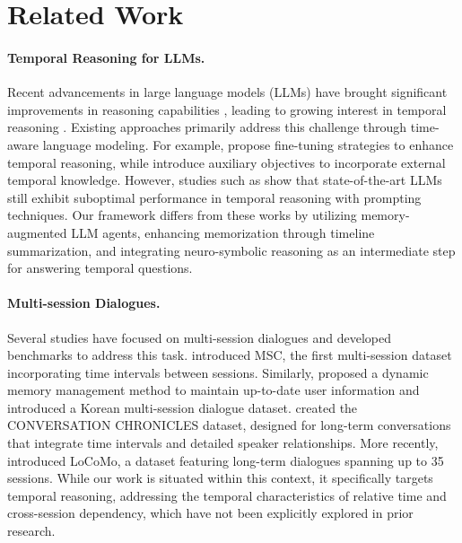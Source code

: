 \section{Related Work}

\paragraph{Temporal Reasoning for LLMs.} 
Recent advancements in large language models (LLMs) have brought significant improvements in reasoning capabilities \cite{huang2023towards}, leading to growing interest in temporal reasoning \cite{chu-etal-2024-timebench,qiu2024large}. Existing approaches primarily address this challenge through time-aware language modeling. For example, \citeauthor{kanashiro-pereira-2022-attention, tan2023towards} propose fine-tuning strategies to enhance temporal reasoning, while \citeauthor{zhou2021temporal,yang-etal-2023-upon} introduce auxiliary objectives to incorporate external temporal knowledge. However, studies such as \citeauthor{chu-etal-2024-timebench,qiu2024large} show that state-of-the-art LLMs still exhibit suboptimal performance in temporal reasoning with prompting techniques. Our framework differs from these works by utilizing memory-augmented LLM agents, enhancing memorization through timeline summarization, and integrating neuro-symbolic reasoning as an intermediate step for answering temporal questions.

\paragraph{Multi-session Dialogues.} 
Several studies have focused on multi-session dialogues and developed benchmarks to address this task. \citeauthor{xu-etal-2022-beyond} introduced MSC, the first multi-session dataset incorporating time intervals between sessions. Similarly, \citeauthor{bae-etal-2022-keep} proposed a dynamic memory management method to maintain up-to-date user information and introduced a Korean multi-session dialogue dataset. \citeauthor{jang2023conversation} created the CONVERSATION CHRONICLES dataset, designed for long-term conversations that integrate time intervals and detailed speaker relationships. More recently, \citeauthor{maharana-etal-2024-evaluating} introduced LoCoMo, a dataset featuring long-term dialogues spanning up to 35 sessions. While our work is situated within this context, it specifically targets temporal reasoning, addressing the temporal characteristics of relative time and cross-session dependency, which have not been explicitly explored in prior research.